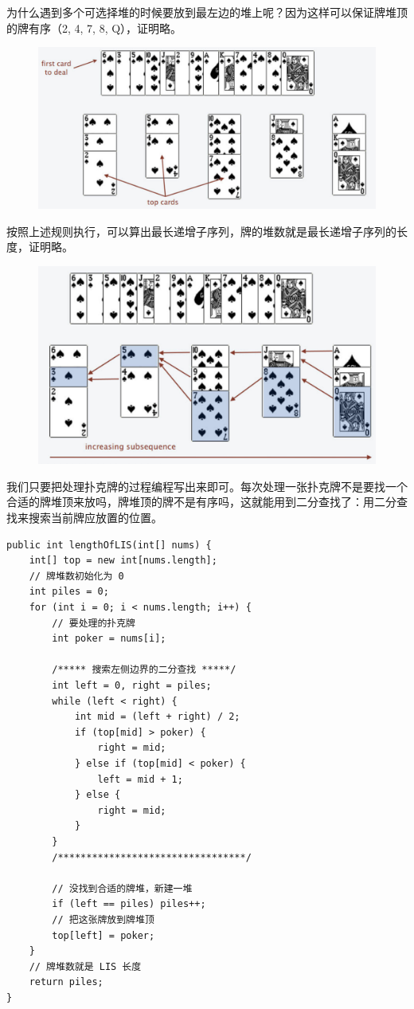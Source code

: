 \documentclass[12pt]{article}
\begin{document}
为什么遇到多个可选择堆的时候要放到最左边的堆上呢？因为这样可以保证牌堆顶的牌有序（2, 4, 7, 8, Q），证明略。
\begin{figure}[H]
    \centering
    \includegraphics[width=1\textwidth]{fig/Dynamic_Programming_Longest_Increasing Subsequence_8.png}
\end{figure}

按照上述规则执行，可以算出最长递增子序列，牌的堆数就是最长递增子序列的长度，证明略。
\begin{figure}[H]
    \centering
    \includegraphics[width=1\textwidth]{fig/Dynamic_Programming_Longest_Increasing Subsequence_9.png}
\end{figure}
我们只要把处理扑克牌的过程编程写出来即可。每次处理一张扑克牌不是要找一个合适的牌堆顶来放吗，牌堆顶的牌不是有序吗，这就能用到二分查找了：用二分查找来搜索当前牌应放置的位置。
\begin{lstlisting}
public int lengthOfLIS(int[] nums) {
    int[] top = new int[nums.length];
    // 牌堆数初始化为 0
    int piles = 0;
    for (int i = 0; i < nums.length; i++) {
        // 要处理的扑克牌
        int poker = nums[i];

        /***** 搜索左侧边界的二分查找 *****/
        int left = 0, right = piles;
        while (left < right) {
            int mid = (left + right) / 2;
            if (top[mid] > poker) {
                right = mid;
            } else if (top[mid] < poker) {
                left = mid + 1;
            } else {
                right = mid;
            }
        }
        /*********************************/
        
        // 没找到合适的牌堆，新建一堆
        if (left == piles) piles++;
        // 把这张牌放到牌堆顶
        top[left] = poker;
    }
    // 牌堆数就是 LIS 长度
    return piles;
}
\end{lstlisting}
\end{document}
